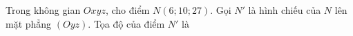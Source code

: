 \begin{ex}
Trong không gian $Oxyz$, cho điểm $N(6;10;27)$. Gọi $N'$ là hình chiếu của $N$ lên mặt phẳng $(Oyz)$. Tọa độ của điểm $N'$ là
\end{ex}
